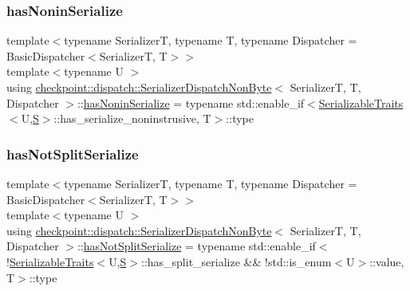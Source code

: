 \subsubsection{\texorpdfstring{has\+Nonin\+Serialize}{hasNoninSerialize}}
{\footnotesize\ttfamily template$<$typename SerializerT, typename T, typename Dispatcher = Basic\+Dispatcher$<$\+Serializer\+T, T$>$$>$ \\
template$<$typename U $>$ \\
using \hyperlink{structcheckpoint_1_1dispatch_1_1_serializer_dispatch_non_byte}{checkpoint\+::dispatch\+::\+Serializer\+Dispatch\+Non\+Byte}$<$ SerializerT, T, Dispatcher $>$\+::\hyperlink{structcheckpoint_1_1dispatch_1_1_serializer_dispatch_non_byte_aee9d815f18b48855fefbecbbbf60436b}{has\+Nonin\+Serialize} =  typename std\+::enable\+\_\+if$<$\hyperlink{structcheckpoint_1_1_serializable_traits}{Serializable\+Traits}$<$U,\hyperlink{structcheckpoint_1_1dispatch_1_1_serializer_dispatch_non_byte_a456d0c02fc35667989d79ddbb0393776}{S}$>$\+::has\+\_\+serialize\+\_\+noninstrusive, T$>$\+::type}

\mbox{\label{structcheckpoint_1_1dispatch_1_1_serializer_dispatch_non_byte_a596c2f6081cc55d5ff0b7486f50b227b}} 
\subsubsection{\texorpdfstring{has\+Not\+Split\+Serialize}{hasNotSplitSerialize}}
{\footnotesize\ttfamily template$<$typename SerializerT, typename T, typename Dispatcher = Basic\+Dispatcher$<$\+Serializer\+T, T$>$$>$ \\
template$<$typename U $>$ \\
using \hyperlink{structcheckpoint_1_1dispatch_1_1_serializer_dispatch_non_byte}{checkpoint\+::dispatch\+::\+Serializer\+Dispatch\+Non\+Byte}$<$ SerializerT, T, Dispatcher $>$\+::\hyperlink{structcheckpoint_1_1dispatch_1_1_serializer_dispatch_non_byte_a596c2f6081cc55d5ff0b7486f50b227b}{has\+Not\+Split\+Serialize} =  typename std\+::enable\+\_\+if$<$!\hyperlink{structcheckpoint_1_1_serializable_traits}{Serializable\+Traits}$<$U,\hyperlink{structcheckpoint_1_1dispatch_1_1_serializer_dispatch_non_byte_a456d0c02fc35667989d79ddbb0393776}{S}$>$\+::has\+\_\+split\+\_\+serialize \&\& !std\+::is\+\_\+enum$<$U$>$\+::value, T$>$\+::type}


